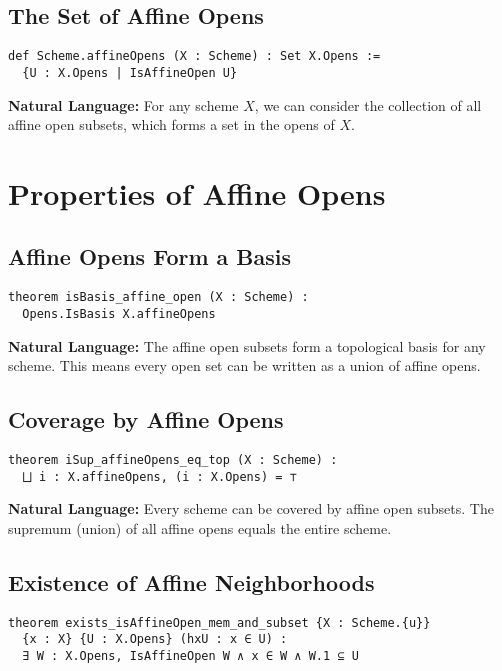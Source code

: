 \documentclass{article}
\theoremstyle{definition}
\begin{document}
\subsection{The Set of Affine Opens}

\begin{lstlisting}
def Scheme.affineOpens (X : Scheme) : Set X.Opens :=
  {U : X.Opens | IsAffineOpen U}
\end{lstlisting}

\textbf{Natural Language:} For any scheme $X$, we can consider the collection of all affine open subsets, which forms a set in the opens of $X$.

\section{Properties of Affine Opens}

\subsection{Affine Opens Form a Basis}

\begin{lstlisting}
theorem isBasis_affine_open (X : Scheme) :
  Opens.IsBasis X.affineOpens
\end{lstlisting}

\textbf{Natural Language:} The affine open subsets form a topological basis for any scheme. This means every open set can be written as a union of affine opens.

\subsection{Coverage by Affine Opens}

\begin{lstlisting}
theorem iSup_affineOpens_eq_top (X : Scheme) :
  ⨆ i : X.affineOpens, (i : X.Opens) = ⊤
\end{lstlisting}

\textbf{Natural Language:} Every scheme can be covered by affine open subsets. The supremum (union) of all affine opens equals the entire scheme.

\subsection{Existence of Affine Neighborhoods}

\begin{lstlisting}
theorem exists_isAffineOpen_mem_and_subset {X : Scheme.{u}}
  {x : X} {U : X.Opens} (hxU : x ∈ U) :
  ∃ W : X.Opens, IsAffineOpen W ∧ x ∈ W ∧ W.1 ⊆ U
\end{lstlisting}
\end{document}
